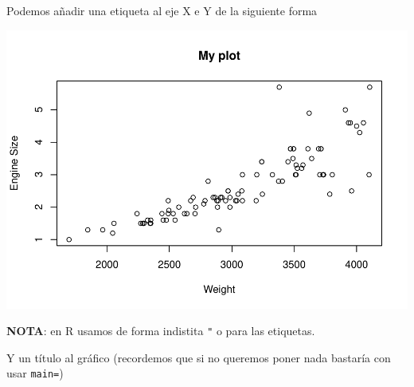 \documentclass[
]{book}
\newenvironment{Shaded}{\begin{snugshade}}{\end{snugshade}}
\newcommand{\AttributeTok}[1]{\textcolor[rgb]{0.77,0.63,0.00}{#1}}
\newcommand{\FunctionTok}[1]{\textcolor[rgb]{0.00,0.00,0.00}{#1}}
\newcommand{\NormalTok}[1]{#1}
\newcommand{\SpecialCharTok}[1]{\textcolor[rgb]{0.00,0.00,0.00}{#1}}
\newcommand{\StringTok}[1]{\textcolor[rgb]{0.31,0.60,0.02}{#1}}
\begin{document}
Podemos añadir una etiqueta al eje X e Y de la siguiente forma

\begin{Shaded}
\end{Shaded}

\includegraphics{fig/unnamed-chunk-90-1.pdf}

\textbf{NOTA}: en R usamos de forma indistita \texttt{"} o \texttt{\textquotesingle{}} para las etiquetas.

Y un título al gráfico (recordemos que si no queremos poner nada bastaría con usar \texttt{main=\textquotesingle{}\textquotesingle{}})

\begin{Shaded}
\end{Shaded}
\end{document}
